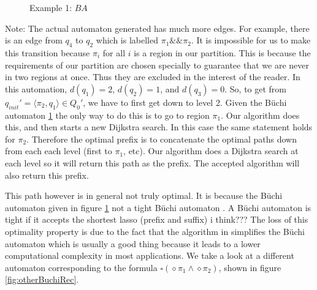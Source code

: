 \begin{figure}
\centering
{}
\caption{Example 1: $BA$}
\label{fig:gasBuchiRec}
\end{figure}
Note: The actual automaton generated has much more edges. For example, there is an edge from $q_4$ to $q_2$ which is labelled $\pi_1 \&\& \pi_2$. It is impossible for us to make this transition because $\pi_i$ for all $i$ is a region in our partition. This is because the requirements of our partition are chosen specially to guarantee that we are never in two regions at once. Thus they are excluded in the interest of the reader. In this automation, $d(q_1)=2$, $d(q_2)=1$, and $d(q_3)=0$. So, to get from $q_{init}' = \langle \pi_2, q_1 \rangle \in Q_0'$, we have to first get down to level 2. Given the B\"{u}chi automaton \ref{fig:gasBuchiRec} the only way to do this is to go to region $\pi_1$. Our algorithm does this, and then starts a new Dijkstra search. In this case the same statement holds for $\pi_2$. Therefore the optimal prefix is to concatenate the optimal paths down from each each level (first to $\pi_1$, etc). Our algorithm does a Dijkstra search at each level so it will return this path as the prefix. The accepted algorithm will also return this prefix. 

This path however is in general not truly optimal. It is because the B\"{u}chi automaton given in figure \ref{fig:gasBuchiRec} not a tight B\"{u}chi automaton \cite{schuppan05}. A B\"{u}chi automaton is tight if it accepts the shortest lasso (prefix and suffix) i think??? The loss of this optimality property is due to the fact that the algorithm in \cite{gastin01} simplifies the B\"{u}chi automaton which is usually a good thing because it leads to a lower computational complexity in most applications. We take a look at a different automaton corresponding to the formula $\square(\diamond \pi_1 \land \diamond \pi_2)$, shown in figure \ref{fig:otherBuchiRec}. 

